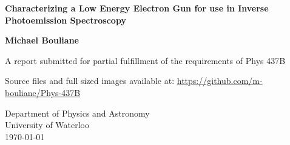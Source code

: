 \documentclass[12pt]{article}
\begin{document}

\begin{titlepage}
    \begin{center}
        \vspace*{1cm}
 
        \textbf{Characterizing a Low Energy Electron Gun for use in Inverse Photoemission Spectroscopy}
             
        \vspace{1.5cm}
 
        \textbf{Michael Bouliane}
 
        \vfill
             
        A report submitted for partial fulfillment of the requirements of Phys 437B

        Source files and full sized images available at: \url{https://github.com/m-bouliane/Phys-437B}
             
        \vspace{0.8cm}
             
        Department of Physics and Astronomy\\
        University of Waterloo\\
        \today\\
             
    \end{center}
\end{titlepage}
\end{document}
